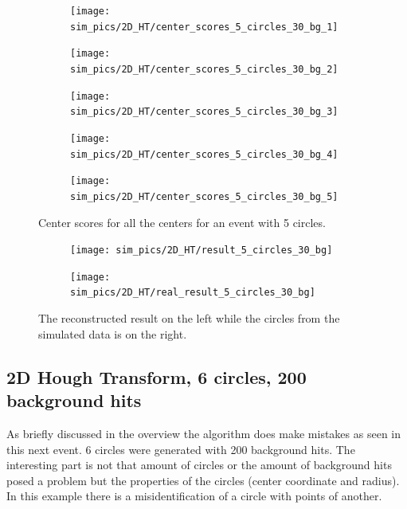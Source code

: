 \documentclass[11pt,twoside]{scrreprt}
\begin{document}
\begin{figure}[htbp]
  \centering
  \begin{subfigure}{0.32\textwidth}
  \centering
  \texttt{[image: sim\_pics/2D\_HT/center\_scores\_5\_circles\_30\_bg\_1]}
  \end{subfigure}
  \begin{subfigure}{0.32\textwidth}
  \centering
  \texttt{[image: sim\_pics/2D\_HT/center\_scores\_5\_circles\_30\_bg\_2]}
  \end{subfigure}
  \begin{subfigure}{0.32\textwidth}
  \centering
  \texttt{[image: sim\_pics/2D\_HT/center\_scores\_5\_circles\_30\_bg\_3]}
  \end{subfigure}
  
  \begin{subfigure}{0.32\textwidth}
  \centering
  \texttt{[image: sim\_pics/2D\_HT/center\_scores\_5\_circles\_30\_bg\_4]}
  \end{subfigure}
  \begin{subfigure}{0.32\textwidth}
  \centering
  \texttt{[image: sim\_pics/2D\_HT/center\_scores\_5\_circles\_30\_bg\_5]}
  \end{subfigure}
  \caption{Center scores for all the centers for an event with 5 circles.}
  \label{fig:2d_5_circles_30_bg_radius}
\end{figure}
\begin{figure}[htbp]
  \centering
  \begin{subfigure}{0.45\textwidth}
  \texttt{[image: sim\_pics/2D\_HT/result\_5\_circles\_30\_bg]}
  \end{subfigure}
  \begin{subfigure}{0.45\textwidth}
  \texttt{[image: sim\_pics/2D\_HT/real\_result\_5\_circles\_30\_bg]}
  \end{subfigure}
  \caption{The reconstructed result on the left while the circles from the simulated data is on the right.}
  \label{fig:2d_5c_results}
\end{figure}

\subsection{2D Hough Transform, 6 circles, 200 background hits} %
\label{sub:2d_hough_transform_6_circles_200_background_hits}
As briefly discussed in the overview the algorithm does make mistakes as seen
in this next event. 6 circles were generated with 200 background hits. The
interesting part is not that amount of circles or the amount of background hits
posed a problem but the properties of the circles (center coordinate and radius). In this example there is a misidentification of a circle with points
of another.
\end{document}
